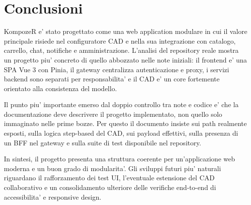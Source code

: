 \chapter{Conclusioni}

KompozeR e' stato progettato come una web application modulare in cui il valore principale risiede nel configuratore CAD e nella sua integrazione con catalogo, carrello, chat, notifiche e amministrazione. L'analisi del repository reale mostra un progetto piu' concreto di quello abbozzato nelle note iniziali: il frontend e' una SPA Vue 3 con Pinia, il gateway centralizza autenticazione e proxy, i servizi backend sono separati per responsabilita' e il CAD e' un core fortemente orientato alla consistenza del modello.

Il punto piu' importante emerso dal doppio controllo tra note e codice e' che la documentazione deve descrivere il progetto implementato, non quello solo immaginato nelle prime bozze. Per questo il documento insiste sui path realmente esposti, sulla logica step-based del CAD, sui payload effettivi, sulla presenza di un BFF nel gateway e sulla suite di test disponibile nel repository.

In sintesi, il progetto presenta una struttura coerente per un'applicazione web moderna e un buon grado di modularita'. Gli sviluppi futuri piu' naturali riguardano il rafforzamento dei test UI, l'eventuale estensione del CAD collaborativo e un consolidamento ulteriore delle verifiche end-to-end di accessibilita' e responsive design.
